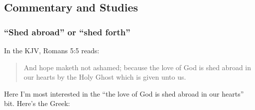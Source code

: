 	
	
	
\subsection{Commentary and Studies} %
	\label{SHED-COMMENTARY}

	
		
	\subsubsection{``Shed abroad'' or ``shed forth''}
		\label{SHED-abroad}
		
		In the KJV, Romans 5:5 reads:
		
		\begin{quote}
			And hope maketh not ashamed; because the love of God is shed abroad in our hearts by the Holy Ghost which is given unto us.
		\end{quote}
		
		Here I'm most interested in the ``the love of God is shed abroad in our hearts'' bit. Here's the Greek:
		
		\begin{quote}
		\end{quote}
		
